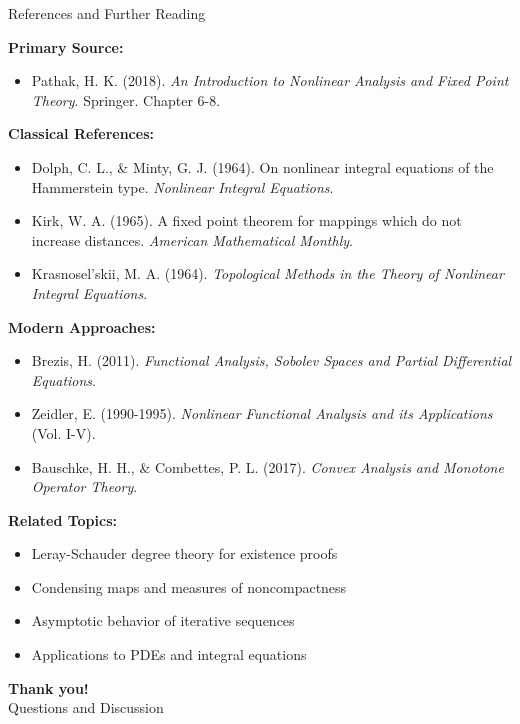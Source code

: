 \documentclass[aspectratio=169,10pt]{beamer}
\begin{document}
\begin{frame}[allowframebreaks]{References and Further Reading}
    \small

    \textbf{Primary Source:}
    \begin{itemize}
        \item Pathak, H. K. (2018). \textit{An Introduction to Nonlinear Analysis and Fixed Point Theory}.
              Springer. Chapter 6-8.
    \end{itemize}

    \vspace{0.3cm}

    \textbf{Classical References:}
    \begin{itemize}
        \item Dolph, C. L., \& Minty, G. J. (1964). On nonlinear integral equations of the Hammerstein type.
              \textit{Nonlinear Integral Equations}.

        \item Kirk, W. A. (1965). A fixed point theorem for mappings which do not increase distances.
              \textit{American Mathematical Monthly}.

        \item Krasnosel'skii, M. A. (1964). \textit{Topological Methods in the Theory of Nonlinear Integral Equations}.
    \end{itemize}

    \vspace{0.3cm}

    \textbf{Modern Approaches:}
    \begin{itemize}
        \item Brezis, H. (2011). \textit{Functional Analysis, Sobolev Spaces and Partial Differential Equations}.

        \item Zeidler, E. (1990-1995). \textit{Nonlinear Functional Analysis and its Applications} (Vol. I-V).

        \item Bauschke, H. H., \& Combettes, P. L. (2017). \textit{Convex Analysis and Monotone Operator Theory}.
    \end{itemize}

    \framebreak

    \textbf{Related Topics:}
    \begin{itemize}
        \item Leray-Schauder degree theory for existence proofs
        \item Condensing maps and measures of noncompactness
        \item Asymptotic behavior of iterative sequences
        \item Applications to PDEs and integral equations
    \end{itemize}
\end{frame}

\begin{frame}
    \centering
    \Large
    \textbf{Thank you!}\\[1cm]
    Questions and Discussion
\end{frame}
\end{document}
